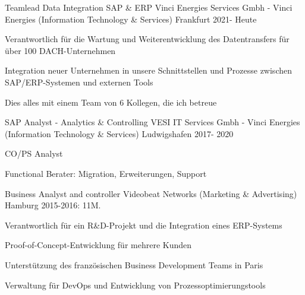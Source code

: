 

\begin{cventries}
	\cventry
			{Teamlead Data Integration SAP \& ERP} %
			{Vinci Energies Services Gmbh - Vinci Energies (Information Technology \& Services)} %
			{Frankfurt} %
			{2021- Heute} %
			{
			\begin{cvitems} %
				\item {Verantwortlich für die Wartung und Weiterentwicklung des Datentransfers für über 100 DACH-Unternehmen}
				\item {Integration neuer Unternehmen in unsere Schnittstellen und Prozesse zwischen SAP/ERP-Systemen und externen Tools}
				\item {Dies alles mit einem Team von 6 Kollegen, die ich betreue}
			\end{cvitems}
			}

	\cventry
		{SAP Analyst - Analytics \& Controlling} %
		{VESI IT Services Gmbh - Vinci Energies (Information Technology \& Services)} %
		{Ludwigshafen} %
		{2017- 2020} %
		{
		\begin{cvitems} %
			\item {CO/PS Analyst}
			\item {Functional Berater: Migration, Erweiterungen, Support}
		\end{cvitems}
		}

	\cventry
		{Business Analyst and controller} %
		{Videobeat Networks (Marketing \& Advertising)} %
		{Hamburg} %
		{2015-2016: 11M.} %
		{
		\begin{cvitems} %
			\item {Verantwortlich für ein R\&D-Projekt und die Integration eines ERP-Systems}
			\item {Proof-of-Concept-Entwicklung für mehrere Kunden}
			\item {Unterstützung des französischen Business Development Teams in Paris}
			\item {Verwaltung für DevOps und Entwicklung von Prozessoptimierungstools}
		\end{cvitems}
		}


\end{cventries}
